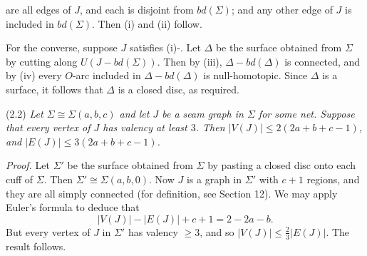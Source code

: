 \noindent are all edges of $J$, and each is disjoint from $bd(\Sigma)$; and any other edge of $J$ is included in $bd(\Sigma)$. Then (i) and (ii) follow.

For the converse, suppose $J$ satisfies (i)-. Let $\Delta$ be the surface obtained from $\Sigma$ by cutting along $U(J - bd(\Sigma))$. Then by (iii), $\Delta - bd(\Delta)$ is connected, and by (iv)  every $O$-arc included in $\Delta - bd(\Delta)$ is null-homotopic. Since $\Delta$ is a surface, it follows that $\Delta$ is a closed disc, as required.

\stmt
(2.2) \textit{Let $\Sigma \cong \Sigma(a, b, c)$ and let $J$ be a seam graph in $\Sigma$ for some net. Suppose that every vertex of $J$ has valency at least $3$. Then $|V(J)| \le 2(2a + b + c - 1)$, and $|E(J)| \le 3(2a + b + c - 1)$.}

\textit{Proof.} Let $\Sigma'$ be the surface obtained from $\Sigma$ by pasting a closed disc onto each cuff of $\Sigma$. Then $\Sigma' \cong \Sigma(a, b, 0)$. Now $J$ is a graph in $\Sigma'$ with $c + 1$ regions, and they are all simply connected (for definition, see Section 12). We may apply Euler's formula to deduce that
\begin{equation*}
|V(J)| - |E(J)| + c + 1 = 2 - 2a - b.
\end{equation*}
But every vertex of $J$ in $\Sigma'$ has valency $\ge 3$, and so $|V(J)| \le \frac{2}{3} |E(J)|$. The result follows.

